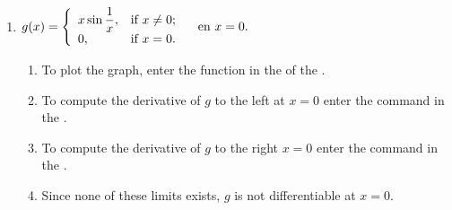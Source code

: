 \begin{enumerate}[leftmargin=*]
\begin{enumerate}
      \item $g(x)=\left\{
            \begin{array}{ll}
            x \sin\dfrac{1}{x}, & \hbox{if $x\neq 0$;} \\
            0,                  & \hbox{if $x=0$.}     \\
            \end{array}
            \right. \quad \textrm{en $x=0$.}$

            \begin{indication}
            \begin{enumerate}
            \item To plot the graph, enter the function  in the  of the .
            \item To compute the derivative of $g$ to the left at $x=0$ enter the command  in the .
            \item To compute the derivative of $g$ to the right $x=0$ enter the command  in the .
            \item Since none of these limits exists, $g$ is not differentiable at $x=0$.
            \end{enumerate}
            \end{indication}
      \end{enumerate}



\end{enumerate}
